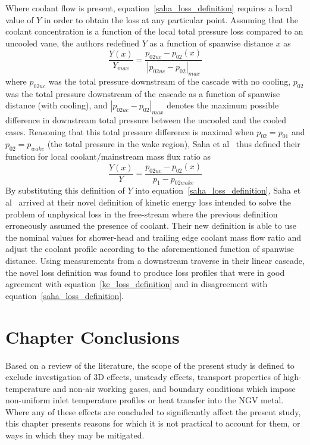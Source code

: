 \documentclass[a4paper, 11pt, oneside]{report}
\begin{document}
Where coolant flow is present, equation~\ref{saha_loss_definition} requires a local value of $Y$ in order to obtain the loss at any particular point. Assuming that the coolant concentration is a function of the local total pressure loss compared to an uncooled vane, the authors redefined $Y$ as a function of spanwise distance $x$ as
\begin{equation}
\frac{Y\left(x\right)}{Y_{max}}
=
\frac{
	p_{02uc} - p_{02}\left(x\right)
}{
	\left| p_{02uc} - p_{02} \right|_{max}
}
\end{equation}
where $p_{02uc}$ was the total pressure downstream of the cascade with no cooling, $p_{02}$ was the total pressure downstream of the cascade as a function of spanwise distance (with cooling), and $\left| p_{02uc} - p_{02} \right|_{max}$ denotes the maximum possible difference in downstream total pressure between the uncooled and the cooled cases. Reasoning that this total pressure difference is maximal when $p_{02}=p_{01}$ and $p_{02}=p_{wake}$ (the total pressure in the wake region), Saha et al~\cite{saha_loss} thus defined their function for local coolant/mainstream mass flux ratio as
\begin{equation}
\frac{Y\left(x\right)}{Y}
=
\frac{
	p_{02uc} - p_{02}\left(x\right)
}{
	p_1 - p_{02wake}
}
\end{equation}
By substituting this definition of $Y$ into equation~\ref{saha_loss_definition}, Saha et al~\cite{saha_loss} arrived at their novel definition of kinetic energy loss intended to solve the problem of unphysical loss in the free-stream where the previous definition erroneously assumed the presence of coolant. Their new definition is able to use the nominal values for shower-head and trailing edge coolant mass flow ratio and adjust the coolant profile according to the aforementioned function of spanwise distance. Using measurements from a downstream traverse in their linear cascade, the novel loss definition was found to produce loss profiles that were in good agreement with equation~\ref{ke_loss_definition} and in disagreement with equation~\ref{saha_loss_definition}.


\section{Chapter Conclusions}

Based on a review of the literature, the scope of the present study is defined to exclude investigation of 3D effects, unsteady effects, transport properties of high-temperature and non-air working gases, and boundary conditions which impose non-uniform inlet temperature profiles or heat transfer into the NGV metal. Where any of these effects are concluded to significantly affect the present study, this chapter presents reasons for which it is not practical to account for them, or ways in which they may be mitigated.
\end{document}
